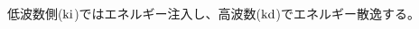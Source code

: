 \documentclass[12pt,a4paper]{jbook}
\def\Vec#1{\mbox{\boldmath $#1$}}			%
\begin{document}
        低波数側($\rm{ki}$)ではエネルギー注入し、高波数($\rm{kd}$)でエネルギー散逸する。
\end{document}
